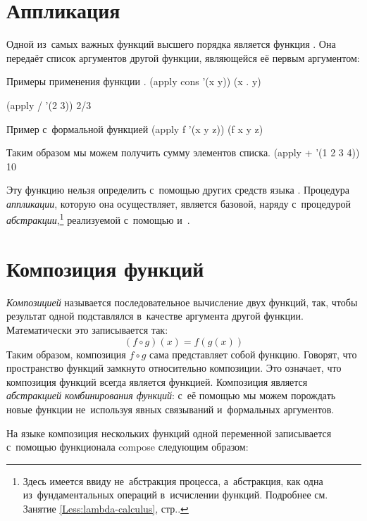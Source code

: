 \section[2]{Аппликация}%
Одной из~самых важных функций высшего порядка является функция . Она передаёт список аргументов другой функции, являющейся её первым аргументом:

\begin{example}{Примеры применения функции .}
\REPL
  {(apply cons '(x y))}
  {(x . y)}

\REPL
  {(apply / '(2 3))}
  {2/3}
\end{example}

\begin{example}{Пример с~формальной функцией}
\REPL
  {(apply f '(x y z))}
  {(f x y z)}
\end{example}

\begin{example}{Таким образом мы можем получить сумму элементов списка.}
\REPL
  {(apply + '(1 2 3 4))}
  {10}
\end{example}

Эту функцию нельзя определить с~помощью других средств языка \Scheme. Процедура \emph{аппликации}, которую она осуществляет, является базовой, наряду с~процедурой \emph{абстракции},\footnote{Здесь имеется ввиду не~абстракция процесса, а~абстракция, как одна из~фундаментальных операций в~исчислении функций. Подробнее см.\,Занятие \ref{Less:lambda-calculus}, стр.\pageref{abstraction}.} реализуемой с~помощью  и~.

\section{Композиция функций}%
\emph{Композицией} называется последовательное вычисление двух функций, так, чтобы результат одной подставлялся в~качестве аргумента другой функции. Математически это записывается так:$$(f \circ g)(x) = f(g(x))$$
Таким образом, композиция $f \circ g$ сама представляет собой функцию. Говорят, что пространство функций замкнуто относительно композиции. Это означает, что композиция функций всегда является функцией. Композиция является \emph{абстракцией комбинирования функций}: с~её помощью мы можем порождать новые функции не~используя явных связываний и~формальных аргументов.

На языке \Scheme композиция нескольких функций одной переменной записывается с~помощью функционала \si{compose} следующим образом:
\begin{center}
\end{center}

